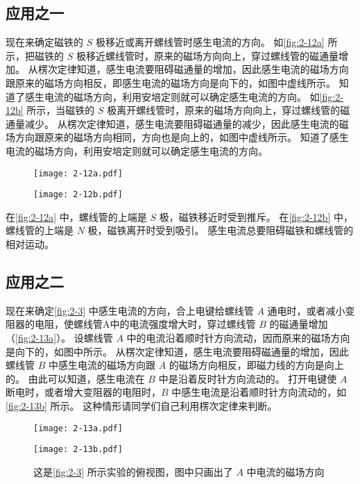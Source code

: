 \subsection*{应用之一}
现在来确定磁铁的 $S$ 极移近或离开螺线管时感生电流的方向。
如\cref{fig:2-12a} 所示，把磁铁的 $S$ 极移近螺线管时，原来的磁场方向向上，穿过螺线管的磁通量增加。
从楞次定律知道，感生电流要阻碍磁通量的增加，因此感生电流的磁场方向跟原来的磁场方向相反，即感生电流的磁场方向是向下的，如图中虚线所示。
知道了感生电流的磁场方向，利用安培定则就可以确定感生电流的方向。
如\cref{fig:2-12b} 所示，当磁铁的 $S$ 极离开螺线管时，原来的磁场方向向上，穿过螺线管的磁通量减少。
从楞次定律知道，感生电流要阻碍磁通量的减少，因此感生电流的磁场方向跟原来的磁场方向相同，方向也是向上的，如图中虚线所示。
知道了感生电流的磁场方向，利用安培定则就可以确定感生电流的方向。
\begin{figure}
  \begin{minipage}[b]{0.4\linewidth}\centering
    \texttt{[image: 2-12a.pdf]}
    \subcaption{}\label{fig:2-12a}
  \end{minipage}
  \begin{minipage}[b]{0.4\linewidth}\centering
    \texttt{[image: 2-12b.pdf]}
    \subcaption{}\label{fig:2-12b}
  \end{minipage}
  \caption{}\label{fig:2-12}
\end{figure}

在\cref{fig:2-12a} 中，螺线管的上端是 $S$ 极，磁铁移近时受到推斥。
在\cref{fig:2-12b} 中，螺线管的上端是 $N$ 极，磁铁离开时受到吸引。
感生电流总要阻碍磁铁和螺线管的相对运动。

\subsection*{应用之二}
现在来确定\cref{fig:2-3} 中感生电流的方向，合上电键给螺线管 $A$ 通电时，或者减小变阻器的电阻，使螺线管A中的电流强度增大时，穿过螺线管 $B$ 的磁通量增加（\cref{fig:2-13a}）。
设螺线管 $A$ 中的电流沿着顺时针方向流动，因而原来的磁场方向是向下的，如图中所示。
从楞次定律知道，感生电流要阻碍磁通量的增加，因此螺线管 $B$ 中感生电流的磁场方向跟 $A$ 的磁场方向相反，即磁力线的方向是向上的。
由此可以知道，感生电流在 $B$ 中是沿着反时针方向流动的。
打开电键使 $A$ 断电时，或者增大变阻器的电阻时，$B$ 中感生电流是沿着顺时针方向流动的，如\cref{fig:2-13b} 所示。
这种情形请同学们自己利用楞次定律来判断。
\begin{figure}
  \begin{minipage}[b]{0.48\linewidth}\centering
    \texttt{[image: 2-13a.pdf]}
    \subcaption{}\label{fig:2-13a}
  \end{minipage}
  \begin{minipage}[b]{0.48\linewidth}\centering
    \texttt{[image: 2-13b.pdf]}
    \subcaption{}\label{fig:2-13b}
  \end{minipage}
  \caption{这是\cref{fig:2-3} 所示实验的俯视图，图中只画出了 $A$ 中电流的磁场方向}\label{fig:2-13}
\end{figure}

